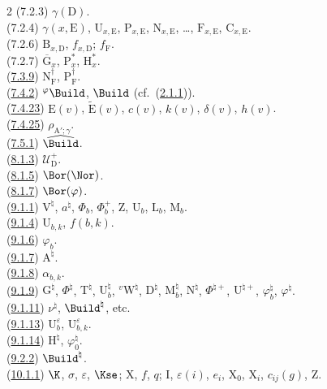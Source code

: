 \documentclass[12pt,a4paper,oneside,english]{smfart}
\newcommand{\btref}[1]{\hyperlink{bt:#1}{#1}}
\theoremstyle{definition}
\theoremstyle{bt}
\begin{document}
\begin{multicols}{2}
(7.2.3) $\gamma(\mathrm{D})$.\\
(7.2.4) $\gamma(x,\mathrm{E})$, $\mathrm{U}_{x,\mathrm{E}}$, $\mathrm{P}_{x,\mathrm{E}}$, $\mathrm{N}_{x,\mathrm{E}}$, \dots, $\mathrm{F}_{x,\mathrm{E}}$, $\mathrm{C}_{x,\mathrm{E}}$.\\
(7.2.6) $\mathrm{B}_{x,\mathrm{D}}$, $f_{x,\mathrm{D}}$; $f_{\mathrm{F}}$.\\
(7.2.7) $\overline{\mathrm{G}}_x$, $\mathrm{P}^{*}_x$, $\mathrm{H}^{*}_x$.\\
(\btref{7.3.9}) $\mathrm{N}^{\dagger}_{\mathrm{F}}$, $\mathrm{P}^{\dagger}_{\mathrm{F}}$.\\
(\btref{7.4.2}) $^{\varphi}\Build$, $\Build$ (cf.\ (\btref{2.1.1})).\\
(\btref{7.4.23}) $\mathrm{E}(v)$, $\widetilde{\mathrm{E}}(v)$, $c(v)$, $k(v)$, $\delta(v)$, $h(v)$.\\
(\btref{7.4.25}) $\rho_{\mathrm{A}';\gamma}$.\\
(\btref{7.5.1}) $\widehat{\Build}$.\\
(\btref{8.1.3}) $\mathscr{U}^{+}_{\mathrm{D}}$.\\
(\btref{8.1.5}) $\Bor(\Nor)$.\\
(\btref{8.1.7}) $\Bor(\varphi)$.\\
(\btref{9.1.1}) $\mathrm{V}^{\natural}$, $a^{\natural}$, $\Phi_b$, $\Phi^{+}_b$, $\mathrm{Z}$, $\mathrm{U}_b$, $\mathrm{L}_b$, $\mathrm{M}_b$.\\
(\btref{9.1.4}) $\mathrm{U}_{b,k}$, $f(b,k)$.\\
(\btref{9.1.6}) $\varphi_b$.\\
(\btref{9.1.7}) $\mathrm{A}^{\natural}$.\\
(\btref{9.1.8}) $\alpha_{b,k}$.\\
(\btref{9.1.9}) $\mathrm{G}^{\natural}$, $\Phi^{\natural}$, $\mathrm{T}^{\natural}$, $\mathrm{U}^{\natural}_b$, $^{v}\mathrm{W}^{\natural}$, $\mathrm{D}^{\natural}$, $\mathrm{M}^{\natural}_b$, $\mathrm{N}^{\natural}$, $\Phi^{\natural+}$, $\mathrm{U}^{\natural+}$, $\varphi^{\natural}_b$, $\varphi^{\natural}$.\\
(\btref{9.1.11}) $\nu^{\natural}$, $\Build^{\natural}$, etc.\\
(\btref{9.1.13}) $\mathrm{U}^{\varepsilon}_b$, $\mathrm{U}^{\varepsilon}_{b,k}$.\\
(\btref{9.1.14}) $\mathrm{H}^{\natural}$, $\varphi^{\natural}_0$.\\
(\btref{9.2.2}) $\Build^{\natural}$.\\
(\btref{10.1.1}) $\K$, $\sigma$, $\varepsilon$, $\Kse$; $\mathrm{X}$, $f$, $q$; $\mathrm{I}$, $\varepsilon(i)$, $e_i$, $\mathrm{X}_0$, $\mathrm{X}_i$, $c_{ij}(g)$, $\mathrm{Z}$.\\

\end{multicols}
\end{document}
